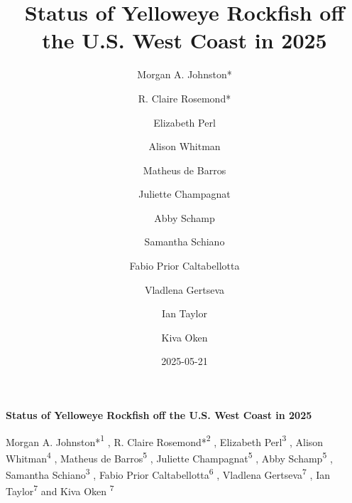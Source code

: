 \documentclass[
]{scrartcl}
\title{Status of Yelloweye Rockfish off the U.S. West Coast in 2025}
\author{Morgan A. Johnston* \and R. Claire Rosemond* \and Elizabeth
Perl \and Alison Whitman \and Matheus de Barros \and Juliette
Champagnat \and Abby Schamp \and Samantha Schiano \and Fabio Prior
Caltabellotta \and Vladlena Gertseva \and Ian Taylor \and Kiva Oken}
\date{2025-05-21}
\begin{document}
  \begin{titlepage}

  \begin{minipage}[b][\textheight][s]{\textwidth}


  \raggedright




  {\huge\bfseries\nohyphens{Status of Yelloweye Rockfish off the U.S.
  West Coast in 2025}}\\[1\baselineskip]



  \vspace{1\baselineskip}


  \vspace{1\baselineskip}

   {\large{Morgan A. Johnston*}}{\textsuperscript{1}}%
  ,
   {\large{R. Claire Rosemond*}}{\textsuperscript{2}}%
  ,
   {\large{Elizabeth Perl}}{\textsuperscript{3}}%
  ,
   {\large{Alison Whitman}}{\textsuperscript{4}}%
  ,
   {\large{Matheus de Barros}}{\textsuperscript{5}}%
  ,
   {\large{Juliette Champagnat}}{\textsuperscript{5}}%
  ,
   {\large{Abby Schamp}}{\textsuperscript{5}}%
  ,
   {\large{Samantha Schiano}}{\textsuperscript{3}}%
  ,
   {\large{Fabio Prior Caltabellotta}}{\textsuperscript{6}}%
  ,
   {\large{Vladlena Gertseva}}{\textsuperscript{7}}%
  ,
   {\large{Ian Taylor}}{\textsuperscript{7}}%
  { and \large{Kiva Oken}}%
  {\textsuperscript{7}}%



\end{minipage}
\end{titlepage}
\end{document}
